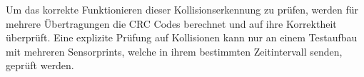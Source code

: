 Um das korrekte Funktionieren dieser Kollisionserkennung zu prüfen, werden für mehrere Übertragungen die CRC Codes berechnet und auf ihre Korrektheit überprüft. Eine explizite Prüfung auf Kollisionen kann nur an einem Testaufbau mit mehreren Sensorprints, welche in ihrem bestimmten Zeitintervall senden, geprüft werden. 